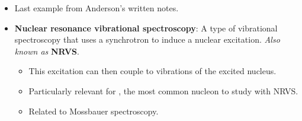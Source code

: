 \documentclass[../notes.tex]{subfiles}
\begin{document}
\begin{itemize}
\begin{enumerate}
\begin{itemize}
        \end{itemize}
        \item Test if a metal complex has a  bond.
        \begin{itemize}
            \item Synthesize your complex with both  and .
            \item Know that  is approximately \SI{1000}{\per\centi\meter} and use the above to calculate that  is about \SI{920}{\per\centi\meter}.
            \item Take spectra of both complexes and then subtract the two to obtain a difference spectrum. If nitrogen is being incorporated, your difference spectrum should be flat except for two peaks (one positive and one negative) at \SI{1000}{\per\centi\meter} and \SI{920}{\per\centi\meter}.
        \end{itemize}
    \end{enumerate}
    \item Last example from Anderson's written notes.
    \item \textbf{Nuclear resonance vibrational spectroscopy}: A type of vibrational spectroscopy that uses a synchrotron to induce a nuclear excitation. \emph{Also known as} \textbf{NRVS}.
    \begin{itemize}
        \item This excitation can then couple to vibrations of the excited nucleus.
        \item Particularly relevant for , the most common nucleon to study with NRVS.
        \item Related to Mossbauer spectroscopy.
    \end{itemize}
\end{itemize}
\end{document}
